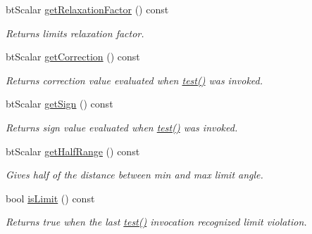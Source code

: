 \begin{DoxyCompactItemize}
\mbox{\label{classbtAngularLimit_adce9b76f4e9c815806e6bf7ab8928194}} 
bt\+Scalar \hyperlink{classbtAngularLimit_adce9b76f4e9c815806e6bf7ab8928194}{get\+Relaxation\+Factor} () const
\begin{DoxyCompactList}\small\item\em Returns limit\textquotesingle{}s relaxation factor. \end{DoxyCompactList}\item 
\mbox{\label{classbtAngularLimit_a5f29d9654eaf63fb3e70e5d435e65121}} 
bt\+Scalar \hyperlink{classbtAngularLimit_a5f29d9654eaf63fb3e70e5d435e65121}{get\+Correction} () const
\begin{DoxyCompactList}\small\item\em Returns correction value evaluated when \hyperlink{classbtAngularLimit_aa8908e320fa18257118bbe81948142d8}{test()} was invoked. \end{DoxyCompactList}\item 
\mbox{\label{classbtAngularLimit_a862f3e44e3effe07b68ba5da11085fa5}} 
bt\+Scalar \hyperlink{classbtAngularLimit_a862f3e44e3effe07b68ba5da11085fa5}{get\+Sign} () const
\begin{DoxyCompactList}\small\item\em Returns sign value evaluated when \hyperlink{classbtAngularLimit_aa8908e320fa18257118bbe81948142d8}{test()} was invoked. \end{DoxyCompactList}\item 
\mbox{\label{classbtAngularLimit_acce7e5c554ebebbdf15e572dcd0bb2f9}} 
bt\+Scalar \hyperlink{classbtAngularLimit_acce7e5c554ebebbdf15e572dcd0bb2f9}{get\+Half\+Range} () const
\begin{DoxyCompactList}\small\item\em Gives half of the distance between min and max limit angle. \end{DoxyCompactList}\item 
\mbox{\label{classbtAngularLimit_a034951d30c7aa18f0e0ed7f2673175ee}} 
bool \hyperlink{classbtAngularLimit_a034951d30c7aa18f0e0ed7f2673175ee}{is\+Limit} () const
\begin{DoxyCompactList}\small\item\em Returns true when the last \hyperlink{classbtAngularLimit_aa8908e320fa18257118bbe81948142d8}{test()} invocation recognized limit violation. \end{DoxyCompactList}\item 

\end{DoxyCompactItemize}

